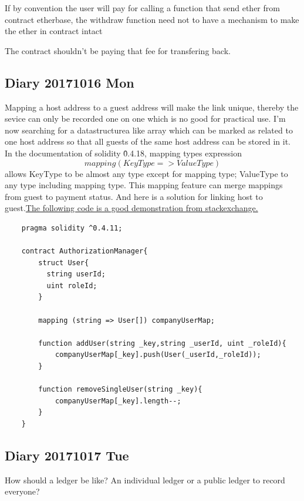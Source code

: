     If by convention the user will pay for calling a function that send ether from contract etherbase, 
    the withdraw function need not to have a mechanism to make the ether in contract intact
    
The contract shouldn't be paying that fee for transfering back. 



\subsection{Diary 20171016 Mon}
Mapping a host address to a guest address will make the link unique, thereby the sevice can only be recorded one on one which is no good for practical use.
I'm now searching for a datastructurea like array which can be marked as related to one host address so that all guests of the same host address can be stored in it.
In the documentation of solidity \^0.4.18, mapping types expression $$mapping(KeyType => ValueType)$$
allows KeyType to be almost any type except for mapping type; ValueType to any type including mapping type.
This mapping feature can merge mappings from guest to payment status.
And here is a solution for linking host to guest.\href{https://ethereum.stackexchange.com/questions/27053/how-to-create-a-mapping-of-string-and-struct-array-in-solidity}{The following code is a good demonstration from stackexchange.}
\begin{lstlisting}
    pragma solidity ^0.4.11;
    
    contract AuthorizationManager{
        struct User{
          string userId;
          uint roleId;
        }
    
        mapping (string => User[]) companyUserMap;
    
        function addUser(string _key,string _userId, uint _roleId){
            companyUserMap[_key].push(User(_userId,_roleId));
        }
    
        function removeSingleUser(string _key){
            companyUserMap[_key].length--;
        }
    }
\end{lstlisting}
\subsection{Diary 20171017 Tue}
How should a ledger be like?
An individual ledger or a public ledger to record everyone?
